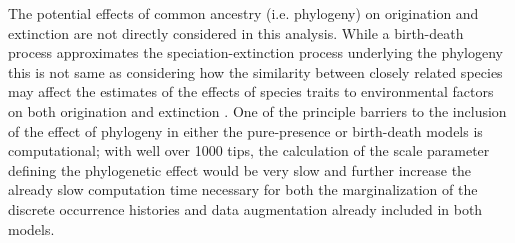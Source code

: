 \documentclass[12pt,letterpaper]{article}
\begin{document}

The potential effects of common ancestry (i.e. phylogeny) on origination and extinction are not directly considered in this analysis. While a birth-death process approximates the speciation-extinction process underlying the phylogeny \citep{Silvestro2014a} this is not same as considering how the similarity between closely related species may affect the estimates of the effects of species traits to environmental factors on both origination and extinction \citep{Smits2015b,Harnik2014}. One of the principle barriers to the inclusion of the effect of phylogeny in either the pure-presence or birth-death models is computational; with well over 1000 tips, the calculation of the scale parameter defining the phylogenetic effect would be very slow and further increase the already slow computation time necessary for both the marginalization of the discrete occurrence histories and data augmentation already included in both models.
\end{document}
